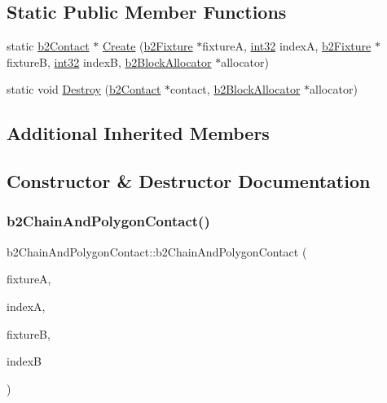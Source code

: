 \subsection*{Static Public Member Functions}
\begin{DoxyCompactItemize}
\item 
static \mbox{\hyperlink{classb2_contact}{b2\+Contact}} $\ast$ \mbox{\hyperlink{classb2_chain_and_polygon_contact_a03e9021485104ae8f485f986703fcd85}{Create}} (\mbox{\hyperlink{classb2_fixture}{b2\+Fixture}} $\ast$fixtureA, \mbox{\hyperlink{b2_settings_8h_a43d43196463bde49cb067f5c20ab8481}{int32}} indexA, \mbox{\hyperlink{classb2_fixture}{b2\+Fixture}} $\ast$fixtureB, \mbox{\hyperlink{b2_settings_8h_a43d43196463bde49cb067f5c20ab8481}{int32}} indexB, \mbox{\hyperlink{classb2_block_allocator}{b2\+Block\+Allocator}} $\ast$allocator)
\item 
static void \mbox{\hyperlink{classb2_chain_and_polygon_contact_aa31bf71d64dd78583505b6da76ef289c}{Destroy}} (\mbox{\hyperlink{classb2_contact}{b2\+Contact}} $\ast$contact, \mbox{\hyperlink{classb2_block_allocator}{b2\+Block\+Allocator}} $\ast$allocator)
\end{DoxyCompactItemize}
\subsection*{Additional Inherited Members}


\subsection{Constructor \& Destructor Documentation}
\mbox{\label{classb2_chain_and_polygon_contact_ae43cd05c72ccaeb5f03efc5df944648b}} 
\subsubsection{\texorpdfstring{b2ChainAndPolygonContact()}{b2ChainAndPolygonContact()}}
{\footnotesize\ttfamily b2\+Chain\+And\+Polygon\+Contact\+::b2\+Chain\+And\+Polygon\+Contact (\begin{DoxyParamCaption}\item[{\mbox{\hyperlink{classb2_fixture}{b2\+Fixture}} $\ast$}]{fixtureA,  }\item[{\mbox{\hyperlink{b2_settings_8h_a43d43196463bde49cb067f5c20ab8481}{int32}}}]{indexA,  }\item[{\mbox{\hyperlink{classb2_fixture}{b2\+Fixture}} $\ast$}]{fixtureB,  }\item[{\mbox{\hyperlink{b2_settings_8h_a43d43196463bde49cb067f5c20ab8481}{int32}}}]{indexB }\end{DoxyParamCaption})}

